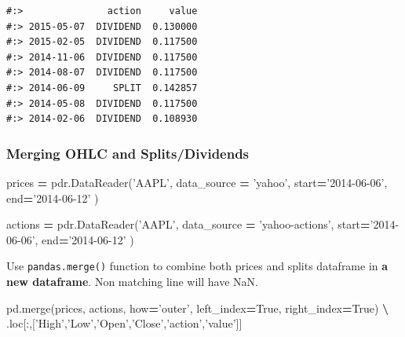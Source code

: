 \documentclass[
]{book}
\newenvironment{Shaded}{\begin{snugshade}}{\end{snugshade}}
\newcommand{\NormalTok}[1]{#1}
\newcommand{\OperatorTok}[1]{\textcolor[rgb]{0.43,0.43,0.43}{\textbf{#1}}}
\newcommand{\StringTok}[1]{\textcolor[rgb]{0.5,0.5,0.5}{#1}}
\newcommand{\VariableTok}[1]{\textcolor[rgb]{0,0,0}{#1}}
\begin{document}
\begin{verbatim}
#:>               action     value
#:> 2015-05-07  DIVIDEND  0.130000
#:> 2015-02-05  DIVIDEND  0.117500
#:> 2014-11-06  DIVIDEND  0.117500
#:> 2014-08-07  DIVIDEND  0.117500
#:> 2014-06-09     SPLIT  0.142857
#:> 2014-05-08  DIVIDEND  0.117500
#:> 2014-02-06  DIVIDEND  0.108930
\end{verbatim}

\hypertarget{merging-ohlc-and-splitsdividends}{%
\subsubsection{Merging OHLC and Splits/Dividends}\label{merging-ohlc-and-splitsdividends}}

\begin{Shaded}
\begin{Highlighting}[]
\NormalTok{prices }\OperatorTok{=}\NormalTok{ pdr.DataReader(}\StringTok{'AAPL'}\NormalTok{,}
\NormalTok{  data_source }\OperatorTok{=} \StringTok{'yahoo'}\NormalTok{,}
\NormalTok{  start}\OperatorTok{=}\StringTok{'2014-06-06'}\NormalTok{, }
\NormalTok{  end}\OperatorTok{=}\StringTok{'2014-06-12'}
\NormalTok{)}

\NormalTok{actions }\OperatorTok{=}\NormalTok{ pdr.DataReader(}\StringTok{'AAPL'}\NormalTok{,}
\NormalTok{  data_source }\OperatorTok{=} \StringTok{'yahoo-actions'}\NormalTok{,}
\NormalTok{  start}\OperatorTok{=}\StringTok{'2014-06-06'}\NormalTok{, }
\NormalTok{  end}\OperatorTok{=}\StringTok{'2014-06-12'}
\NormalTok{)}
\end{Highlighting}
\end{Shaded}

Use \texttt{pandas.merge()} function to combine both prices and splits dataframe in \textbf{a new dataframe}. Non matching line will have NaN.

\begin{Shaded}
\begin{Highlighting}[]
\NormalTok{pd.merge(prices, actions, how}\OperatorTok{=}\StringTok{'outer'}\NormalTok{, left_index}\OperatorTok{=}\VariableTok{True}\NormalTok{, right_index}\OperatorTok{=}\VariableTok{True}\NormalTok{) }\OperatorTok{\textbackslash{}}
\NormalTok{  .loc[:,[}\StringTok{'High'}\NormalTok{,}\StringTok{'Low'}\NormalTok{,}\StringTok{'Open'}\NormalTok{,}\StringTok{'Close'}\NormalTok{,}\StringTok{'action'}\NormalTok{,}\StringTok{'value'}\NormalTok{]]}
\end{Highlighting}
\end{Shaded}
\end{document}
